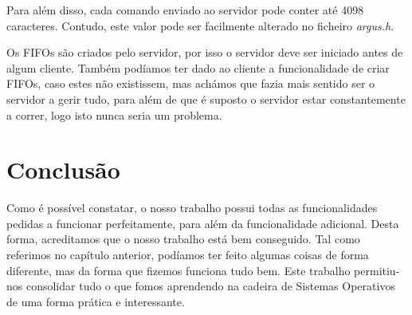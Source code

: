 \documentclass[a4paper]{report}
\begin{document}
	Para além disso, cada comando enviado ao servidor pode conter até 4098 caracteres. Contudo, este valor pode ser facilmente alterado no ficheiro \emph{argus.h}.
	
	Os FIFOs são criados pelo servidor, por isso o servidor deve ser iniciado antes de algum cliente. Também podíamos ter dado ao cliente a funcionalidade de criar FIFOs, caso estes não existissem, mas achámos que fazia mais sentido ser o servidor a gerir tudo, para além de que é suposto o servidor estar constantemente a correr, logo isto nunca seria um problema.

	\chapter{Conclusão}
	
	Como é possível constatar, o nosso trabalho possui todas as funcionalidades pedidas a funcionar perfeitamente, para além da funcionalidade adicional. Desta forma, acreditamos que o nosso trabalho está bem conseguido. Tal como referimos no capítulo anterior, podíamos ter feito algumas coisas de forma diferente, mas da forma que fizemos funciona tudo bem. Este trabalho permitiu-nos consolidar tudo o que fomos aprendendo na cadeira de Sistemas Operativos de uma forma prática e interessante.
\end{document}
